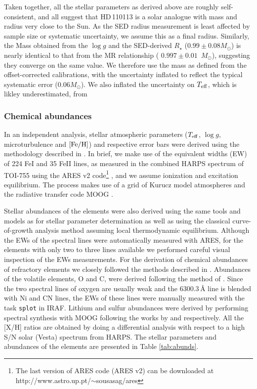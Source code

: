 \documentclass[fleqn,usenatbib]{mnras}
\newcommand{\rstar}{\mbox{$R_{\star}$}}
\newcommand{\msun}{\mbox{$M_{\odot}$}}
\newcommand{\teff}{$T_{\rm eff}$}
\newcommand{\feh}{\mbox{$\rm [Fe/H]$}}
\newcommand{\logg}{$\log g$}
\newcommand{\Tmstartorres}{ $ 0.997 \pm 0.01 $ }
\newcommand{\Tstar}{HD\,110113}
\begin{document}
Taken together, all the stellar parameters as derived above are roughly self-consistent, and all suggest that \Tstar{} is a solar analogue with mass and radius very close to the Sun.
As the SED radius measurement is least affected by sample size or systematic uncertainty, we assume this as a final radius.
Similarly, the Mass obtained from the \logg{} and the SED-derived \rstar{} ($0.99 \pm 0.08 M_\odot$) is nearly identical to that from the MR relationship (\Tmstartorres{}\,\msun{}), suggesting they converge on the same value.
We therefore use the mass as defined from the offset-corrected \citet{2010A&ARv..18...67T} calibrations, with the uncertainty inflated to reflect the typical systematic error ($0.06M_{\odot}$).
We also inflated the uncertainty on \teff{}, which is likley underestimated, from 

\subsubsection{Chemical abundances} \label{sec:parameters}
In an independent analysis, stellar atmospheric parameters (\teff{}, \logg{}, microturbulence and \feh{}) and respective error bars were derived using the methodology described in \citet{Sousa-14, Santos-13}. In brief, we make use of the equivalent widths (EW) of 224 FeI and 35 FeII lines, as measured in the combined HARPS spectrum of TOI-755 using the ARES v2 code\footnote{The last version of ARES code (ARES v2) can be downloaded at http://www.astro.up.pt/$\sim$sousasag/ares} \citep{Sousa-15}, and we assume ionization and excitation equilibrium. The process makes use of a grid of Kurucz model atmospheres \citep{Kurucz-93} and the radiative transfer code MOOG \citep{Sneden-73}.

Stellar abundances of the elements were also derived using the same tools and models as for stellar parameter determination as well as using the classical curve-of-growth analysis method assuming local thermodynamic equilibrium. Although the EWs of the spectral lines were automatically measured with ARES, for the elements with only two to three lines available we performed careful visual inspection of the EWs measurements. For the derivation of chemical abundances of refractory elements we closely followed the methods described in \citep[e.g.][]{Adibekyan-12, Adibekyan-15, Delgado-14, Delgado-17}. Abundances of the volatile elements, O and C, were derived following the method of \cite{Delgado-10, 2015A&A...576A..89B}. Since the two spectral lines of oxygen are usually weak and the 6300.3\,\AA{} line is blended with Ni and CN lines, the EWs of these lines were manually measured with the task \texttt{splot} in IRAF. Lithium and sulfur abundances were derived by performing spectral synthesis with MOOG following the works by \citet{Delgado-14} and \citet{Costa_Silva2020} respectively. All the [X/H] ratios are obtained by doing a differential analysis with respect to a high S/N solar (Vesta) spectrum from HARPS. The stellar parameters and abundances of the elements are presented in Table \ref{tab:abunds}. 
\end{document}
